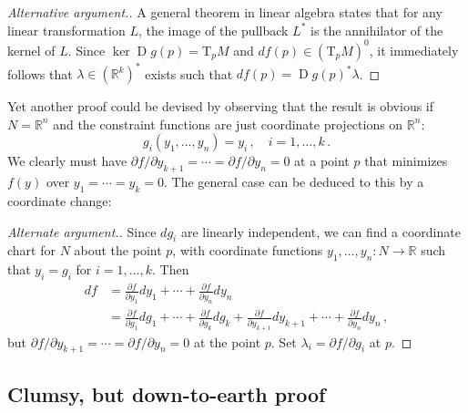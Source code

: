 \documentclass[12pt]{article}
\newcommand{\real}{\mathbb{R}}
\DeclareMathOperator{\D}{D}
\newcommand{\Tp}{\mathrm{T}_p}
\newcommand{\pd}[2]{\frac{\partial #1}{\partial #2}}
\newcommand{\ipd}[2]{\partial #1 / \partial #2}
\begin{document}
\begin{proof}[Alternative argument.]
A general theorem in linear algebra states that for any linear
transformation $L$, 
the image of the pullback $L^*$  
is the annihilator of the kernel of $L$.
Since $\ker \D g(p) = \Tp M$
and $df(p) \in (\Tp M)^0$,
it immediately follows that $\lambda \in (\real^k)^*$
exists such that $df(p) = \D g(p)^* \lambda$.
\end{proof}

Yet another proof
could be devised by observing
that the result is obvious if $N = \real^n$ and the constraint functions
are just coordinate projections on $\real^n$:
\[
g_i(y_1, \dotsc, y_n) = y_i\,, \quad i = 1, \dotsc, k\,.
\]
We clearly must have 
$\ipd{f}{y_{k+1}} = \dotsb = \ipd{f}{y_n} = 0$ 
at a point $p$ that minimizes $f(y)$ over $y_1 = \dotsb = y_k = 0$.
The general case can be deduced to this by a coordinate change:

\begin{proof}[Alternate argument.]
Since $dg_i$ are linearly independent,
we can find  a coordinate chart for $N$ about the point $p$,
with coordinate functions $y_1, \dotsc, y_n \colon N \to \real$
such that $y_i = g_i$ for $i = 1, \dotsc, k$.
Then 
\begin{align*}
df &= 
\pd{f}{y_1} dy_1 + \dotsb + \pd{f}{y_n} dy_n \\
&=
\pd{f}{g_1} dg_1 + \dotsb + \pd{f}{g_k} dg_k + \pd{f}{y_{k+1}} dy_{k+1} + \dotsb + \pd{f}{y_n} dy_n\,,
\end{align*}
but $\ipd{f}{y_{k+1}} = \dotsb = \ipd{f}{y_n} = 0$
at the point $p$.  Set $\lambda_i = \ipd{f}{g_i}$ at $p$.
\end{proof}




\subsection{Clumsy, but down-to-earth proof}
\end{document}
